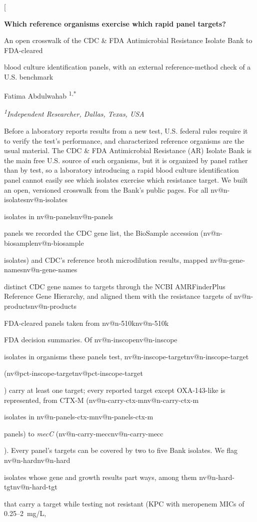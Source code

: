 \documentclass[10pt,twocolumn,letterpaper]{article}
\makeatletter
\newcommand{\nv}[1]{\ifcsname nv@#1\endcsname\csname nv@#1\endcsname\else
  \PackageError{numbers}{Unknown number key: #1}{Run build_assets.py}\fi}
\newcommand{\g}[1]{\textit{#1}}  %
\makeatother
\begin{document}
\twocolumn[
\begin{@twocolumnfalse}
\begin{center}
{\large\bfseries Which reference organisms exercise which rapid panel targets?\par
An open crosswalk of the CDC \& FDA Antimicrobial Resistance Isolate Bank to FDA-cleared\par
blood culture identification panels, with an external reference-method check of a U.S. benchmark\par}
\vspace{10pt}
{\normalsize Fatima Abdulwahab\,\,\textsuperscript{1,*}\par}
\vspace{4pt}
{\small\itshape \textsuperscript{1}Independent Researcher, Dallas, Texas, USA\par}
\vspace{6pt}
\end{center}
\begin{minipage}{0.84\textwidth}\centering
\begin{minipage}{0.98\textwidth}
\small
Before a laboratory reports results from a new test, U.S. federal rules require it to verify the test's performance, and
characterized reference organisms are the usual material. The CDC \& FDA Antimicrobial Resistance (AR) Isolate Bank is the
main free U.S. source of such organisms, but it is organized by panel rather than by test, so a laboratory introducing a
rapid blood culture identification panel cannot easily see which isolates exercise which resistance target. We built an
open, versioned crosswalk from the Bank's public pages. For all \nv{n-isolates} isolates in \nv{n-panels} panels we
recorded the CDC gene list, the BioSample accession (\nv{n-biosample} isolates) and CDC's reference broth microdilution
results, mapped \nv{n-gene-names} distinct CDC gene names to targets through the NCBI AMRFinderPlus Reference Gene
Hierarchy, and aligned them with the resistance targets of \nv{n-products} FDA-cleared panels taken from \nv{n-510k} FDA
decision summaries. Of \nv{n-inscope} isolates in organisms these panels test, \nv{n-inscope-target}
(\nv{pct-inscope-target}) carry at least one target; every reported target except OXA-143-like is represented, from
CTX-M (\nv{n-carry-ctx-m} isolates in \nv{n-panels-ctx-m} panels) to \g{mecC} (\nv{n-carry-mecc}). Every panel's targets
can be covered by two to five Bank isolates. We flag \nv{n-hard} isolates whose gene and growth results part ways, among them
\nv{n-hard-tgt} that carry a target while testing not resistant (KPC with meropenem MICs of 0.25--2~mg/L,

\end{minipage}
\end{minipage}
\end{@twocolumnfalse}
\end{document}
